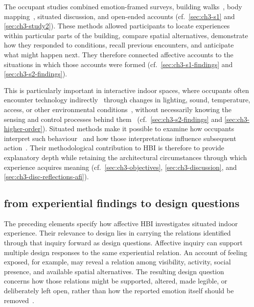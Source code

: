 The occupant studies combined emotion-framed surveys, building walks~\cite{mitchell2020no,crivellaro2015contesting}, body mapping~\cite{turmo2023towards}, situated discussion, and open-ended accounts (cf.~\autoref{sec:ch3-s1} and \autoref{sec:ch3-study2}). These methods allowed participants to locate experiences within particular parts of the building, compare spatial alternatives, demonstrate how they responded to conditions, recall previous encounters, and anticipate what might happen next. They therefore connected affective accounts to the situations in which those accounts were formed (cf.~\autoref{sec:ch3-s1-findings} and \autoref{sec:ch3-s2-findings}).

This is particularly important in interactive indoor spaces, where occupants often encounter technology indirectly~\cite{tolmie2002unremarkable,schnadelbach2019adaptive} through changes in lighting, sound, temperature, access, or other environmental conditions~\cite{saputra2023smart,daissaoui2020iot}, without necessarily knowing the sensing and control processes behind them~\cite{bellotti2002making,lim2009and} (cf.~\autoref{sec:ch3-s2-findings} and \autoref{sec:ch3-higher-order}). Situated methods make it possible to examine how occupants interpret such behaviour~\cite{bellotti2002making,lim2009and} and how those
interpretations influence subsequent action~\cite{dourish2001action,hu2023scoping}. Their methodological contribution to HBI is therefore to provide explanatory depth while retaining the architectural circumstances through which experience acquires meaning (cf.~\autoref{sec:ch3-objectives}, \autoref{sec:ch3-discussion}, and \autoref{sec:ch3-disc-reflections-afi}).


\subsection{from experiential findings to design questions}
\label{subsec:experiential-design-knowledge}

The preceding elements specify how affective HBI investigates situated
indoor experience. Their relevance to design lies in carrying the
relations identified through that inquiry forward as design questions.
Affective inquiry can support multiple design responses to the same experiential relation.
An account of feeling exposed, for example, may reveal a relation among
visibility, activity, social presence, and available spatial
alternatives. The resulting design question concerns how those
relations might be supported, altered, made legible, or deliberately
left open, rather than how the reported emotion itself should be
removed~\cite{rao2025lessons}.

